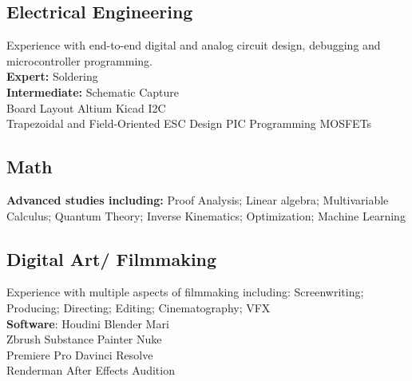 \documentclass[]{deedy-resume-openfont}
\begin{document}
\begin{paracol}{2}
\subsection{Electrical Engineering\hfill}
Experience with end-to-end digital and analog circuit design, debugging and microcontroller programming. \\ 
\textbf{Expert:} Soldering \\ 
\textbf{Intermediate:}
Schematic Capture \\
Board Layout \textbullet{} Altium \textbullet{} Kicad \textbullet{} I2C \\
Trapezoidal and Field-Oriented ESC Design \textbullet{} PIC Programming \textbullet{} MOSFETs
\sectionsep

\subsection{Math}
\textbf{Advanced studies including:} Proof Analysis; Linear algebra; Multivariable Calculus; Quantum Theory; Inverse Kinematics; Optimization; Machine Learning
\sectionsep

\subsection{Digital Art/ Filmmaking\hfill}
Experience with multiple aspects of filmmaking including: Screenwriting; Producing; Directing; Editing; Cinematography; VFX \\
\textbf{Software}: Houdini \textbullet{} Blender \textbullet{} Mari \\ 
Zbrush \textbullet{} Substance Painter \textbullet{} Nuke \\
Premiere Pro \textbullet{} Davinci Resolve \\ Renderman \textbullet{} After Effects \textbullet{} Audition
\sectionsep

%
%
\switchcolumn



\end{paracol}
\end{document}
